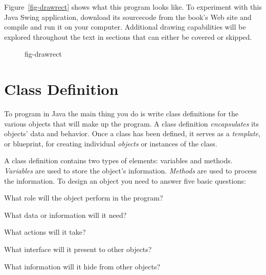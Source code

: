 Figure~\ref{fig-drawrect} shows what this program looks like.  
To experiment with this Java Swing application, download its sourcecode
from the book's Web site and compile
and run it on your computer. Additional drawing capabilities will
be explored throughout the text in sections that can either be covered
or skipped.

\begin{figure}[!bht]
\figaleftscaled{chptr02/drawrect.eps}{0.8}{This is how the {\tt HelloWorldGraphic}
program will look when run.
} {fig-drawrect}

\end{figure}

\section{Class Definition}
\label{sec-classdef}

\noindent To program in Java the main thing you do is write class definitions
for the various objects that will make up the program.  A class
definition {\it encapsulates} its objects' data and behavior.  Once a
class has been defined, it serves as a {\it template}, or blueprint,
for creating individual {\it objects} or instances of the class.

A class definition contains two types of elements: variables and
methods.  {\it Variables} are used to store the
object's information.  {\it Methods} are used to process the
information.  To design an object you need to answer five basic
questions:

\begin{minipage}[t]{26pc}
\begin{NL}
\item  What role will the object perform in the program?
\item  What data or information will it need?
\item  What actions will it take?
\item  What interface will it present to other objects?
\item  What information will it hide from other objects?
\end{NL}
\end{minipage}

